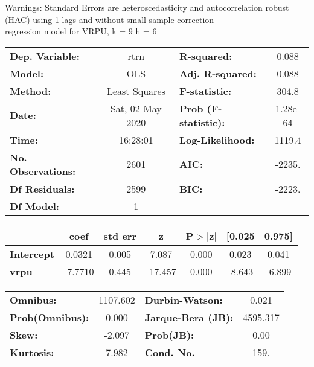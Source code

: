 Warnings: \newline
 [1] Standard Errors are heteroscedasticity and autocorrelation robust (HAC) using 1 lags and without small sample correction\\ 

regression model for VRPU, k = 9 h = 6\begin{center}
\begin{tabular}{lclc}
\toprule
\textbf{Dep. Variable:}    &       rtrn       & \textbf{  R-squared:         } &     0.088   \\
\textbf{Model:}            &       OLS        & \textbf{  Adj. R-squared:    } &     0.088   \\
\textbf{Method:}           &  Least Squares   & \textbf{  F-statistic:       } &     304.8   \\
\textbf{Date:}             & Sat, 02 May 2020 & \textbf{  Prob (F-statistic):} &  1.28e-64   \\
\textbf{Time:}             &     16:28:01     & \textbf{  Log-Likelihood:    } &    1119.4   \\
\textbf{No. Observations:} &        2601      & \textbf{  AIC:               } &    -2235.   \\
\textbf{Df Residuals:}     &        2599      & \textbf{  BIC:               } &    -2223.   \\
\textbf{Df Model:}         &           1      & \textbf{                     } &             \\
\bottomrule
\end{tabular}
\begin{tabular}{lcccccc}
                   & \textbf{coef} & \textbf{std err} & \textbf{z} & \textbf{P$> |$z$|$} & \textbf{[0.025} & \textbf{0.975]}  \\
\midrule
\textbf{Intercept} &       0.0321  &        0.005     &     7.087  &         0.000        &        0.023    &        0.041     \\
\textbf{vrpu}      &      -7.7710  &        0.445     &   -17.457  &         0.000        &       -8.643    &       -6.899     \\
\bottomrule
\end{tabular}
\begin{tabular}{lclc}
\textbf{Omnibus:}       & 1107.602 & \textbf{  Durbin-Watson:     } &    0.021  \\
\textbf{Prob(Omnibus):} &   0.000  & \textbf{  Jarque-Bera (JB):  } & 4595.317  \\
\textbf{Skew:}          &  -2.097  & \textbf{  Prob(JB):          } &     0.00  \\
\textbf{Kurtosis:}      &   7.982  & \textbf{  Cond. No.          } &     159.  \\
\bottomrule
\end{tabular}
\end{center}

